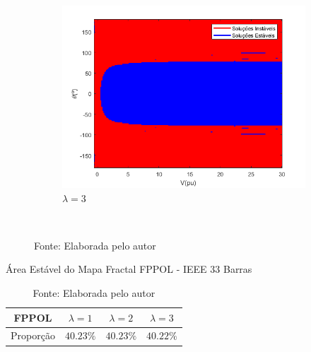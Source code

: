 \begin{figure}[H]
\begin{subfigure}[b]{0.45\textwidth}
        \centering
        \includegraphics[width=\textwidth]{textuais/capitulo4/figuras/33_FP_POL_3lambda.png}
        \caption{$\lambda=3$}
    \end{subfigure}
        \\
   \caption*{Fonte: Elaborada pelo autor}
   \label{fig:FPPOL-14}
\end{figure}

\begin{table}[H]
    \centering
    \caption{Área Estável do Mapa Fractal FPPOL - IEEE 33 Barras}
    \begin{tabular}{c c c c}
        \toprule
        FPPOL & $\lambda = 1$ & $\lambda = 2$ & $\lambda = 3$ \\
        \midrule
        Proporção & $40.23\%$ & $40.23\%$ & $40.22\%$\\
        \bottomrule
    \end{tabular}
    \caption*{Fonte: Elaborada pelo autor}
    \label{tabela_fractal_FPPOL_33}
\end{table}

